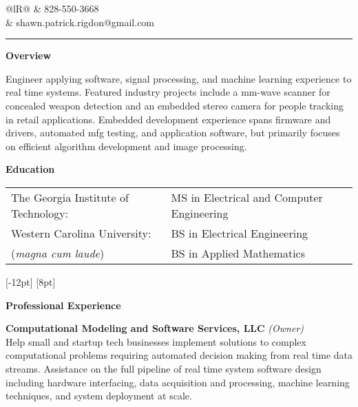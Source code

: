 \documentclass[14pt,letterpaper]{extarticle}
\begin{document}
\pagestyle{empty}


\noindent
\begin{tabularx}{\linewidth}{@{}lR@{}}
 & \footnotesize{828-550-3668} \\[-4pt]
& \footnotesize{shawn.patrick.rigdon@gmail.com} \\[-4pt]
\end{tabularx}

\smallskip
\noindent\rule[\baselineskip]{\linewidth}{1.5pt}


\noindent\textbf{\large{Overview}}

\medskip
\noindent\footnotesize{Engineer applying software, signal processing, and machine learning experience
to real time systems.  Featured industry projects include a mm-wave scanner for concealed weapon
detection and an embedded stereo camera for people tracking in retail applications.  Embedded development
experience spans firmware and drivers, automated mfg testing, and application software, but primarily
focuses on efficient algorithm development and image processing.}

\bigskip
\noindent\textbf{\large{Education}}

\medskip\noindent
\begin{tabular}{@{}ll@{}}
\footnotesize{The Georgia Institute of Technology:} & \footnotesize{MS in Electrical and Computer Engineering}\\[5pt]
\footnotesize{Western Carolina University:} & \footnotesize{BS in Electrical Engineering}\\
\footnotesize{(\textit{magna cum laude})} & \footnotesize{BS in Applied Mathematics}\\
\end{tabular}
[-12pt]
[8pt]

\bigskip
\noindent\textbf{\large{Professional Experience}}

\newcommand{\experience}[4]{
\medskip
\marginnote{\footnotesize{\textit{#1}}}
\noindent\footnotesize{\textbf{#2} \textit{(#3)}}\\
#4
}

\experience{2020}{Computational Modeling and Software Services, LLC}{Owner}{
Help small and startup tech businesses implement solutions to complex computational problems requiring
automated decision making from real time data streams.  Assistance on the full pipeline of real time
system software design including hardware interfacing, data acquisition and processing, machine learning
techniques, and system deployment at scale.
}
\end{document}

